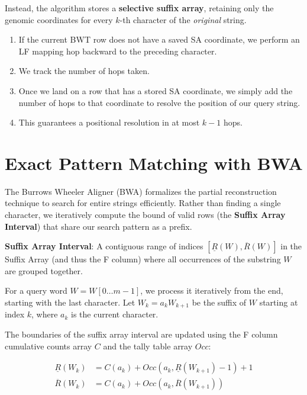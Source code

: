 Instead, the algorithm stores a \textbf{selective suffix array}, retaining only the genomic coordinates for every $k$-th character of the \textit{original} string. 
\begin{enumerate}
    \item If the current BWT row does not have a saved SA coordinate, we perform an LF mapping hop backward to the preceding character.
    \item We track the number of hops taken.
    \item Once we land on a row that has a stored SA coordinate, we simply add the number of hops to that coordinate to resolve the position of our query string.
    \item This guarantees a positional resolution in at most $k-1$ hops.
\end{enumerate}

\section{Exact Pattern Matching with BWA}

The Burrows Wheeler Aligner (BWA) formalizes the partial reconstruction technique to search for entire strings efficiently. Rather than finding a single character, we iteratively compute the bound of valid rows (the \textbf{Suffix Array Interval}) that share our search pattern as a prefix.

\begin{important}
    \textbf{Suffix Array Interval}: A contiguous range of indices $[\underline{R}(W), \overline{R}(W)]$ in the Suffix Array (and thus the F column) where all occurrences of the substring $W$ are grouped together.
\end{important}

For a query word $W = W[0 \dots m-1]$, we process it iteratively from the end, starting with the last character. Let $W_k = a_k W_{k+1}$ be the suffix of $W$ starting at index $k$, where $a_k$ is the current character.

The boundaries of the suffix array interval are updated using the F column cumulative counts array $C$ and the tally table array $Occ$:

\begin{align}
    \underline{R}(W_k) &= C(a_k) + Occ(a_k, \underline{R}(W_{k+1}) - 1) + 1 \label{eq:lower_bound} \\
    \overline{R}(W_k) &= C(a_k) + Occ(a_k, \overline{R}(W_{k+1})) \label{eq:upper_bound}
\end{align}

